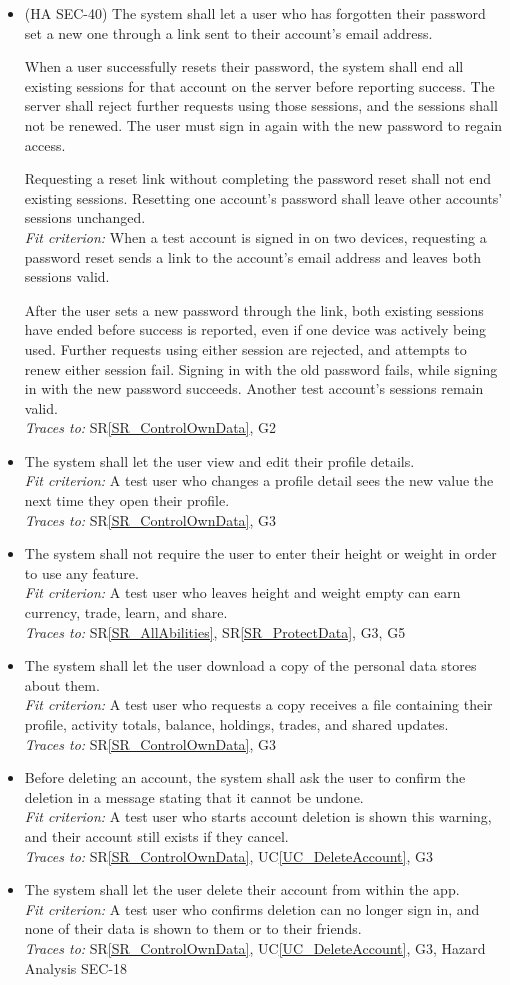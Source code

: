 \documentclass[12pt]{article}
\newcommand{\srref}[1]{SR\ref{#1}}
\newcommand{\ucref}[1]{UC\ref{#1}}
\newcounter{reqnum} %
\newcommand{\freq}[4]{%
  \item[FR\refstepcounter{reqnum}\thereqnum \label{#1}:] #2\\
  \textit{Fit criterion:} #3\\
  \textit{Traces to:} #4}
\begin{document}
\begin{itemize}
{  After either action, signing in again with the correct email address
  and password succeeds. Neither action affects another test account's
  sessions.}
  {\srref{SR_ProtectData}, G3}
\freq{FR_AcctResetPassword}
  {(HA SEC-40) The system shall let a user who has forgotten their password
  set a new one through a link sent to their account's email address.

  When a user successfully resets their password, the system shall end
  all existing sessions for that account on the server before reporting
  success. The server shall reject further requests using those sessions,
  and the sessions shall not be renewed. The user must sign in again
  with the new password to regain access.

  Requesting a reset link without completing the password reset shall not
  end existing sessions. Resetting one account's password shall leave
  other accounts' sessions unchanged.}
  {When a test account is signed in on two devices, requesting a password
  reset sends a link to the account's email address and leaves both
  sessions valid.

  After the user sets a new password through the link, both existing
  sessions have ended before success is reported, even if one device was
  actively being used. Further requests using either session are rejected,
  and attempts to renew either session fail. Signing in with the old
  password fails, while signing in with the new password succeeds.
  Another test account's sessions remain valid.}
  {\srref{SR_ControlOwnData}, G2}
\freq{FR_AcctEditProfile}
  {The system shall let the user view and edit their profile details.}
  {A test user who changes a profile detail sees the new value the next time
  they open their profile.}
  {\srref{SR_ControlOwnData}, G3}
\freq{FR_AcctBodyOptional}
  {The system shall not require the user to enter their height or weight in
  order to use any feature.}
  {A test user who leaves height and weight empty can earn currency, trade,
  learn, and share.}
  {\srref{SR_AllAbilities}, \srref{SR_ProtectData}, G3, G5}
\freq{FR_AcctDownloadData}
  {The system shall let the user download a copy of the personal data
  \progname{} stores about them.}
  {A test user who requests a copy receives a file containing their profile,
  activity totals, balance, holdings, trades, and shared updates.}
  {\srref{SR_ControlOwnData}, G3}
\freq{FR_AcctDeleteConfirm}
  {Before deleting an account, the system shall ask the user to confirm the
  deletion in a message stating that it cannot be undone.}
  {A test user who starts account deletion is shown this warning, and their
  account still exists if they cancel.}
  {\srref{SR_ControlOwnData}, \ucref{UC_DeleteAccount}, G3}
\freq{FR_AcctDelete}
  {The system shall let the user delete their account from within the app.}
  {A test user who confirms deletion can no longer sign in, and none of their
  data is shown to them or to their friends.}
  {\srref{SR_ControlOwnData}, \ucref{UC_DeleteAccount}, G3, Hazard Analysis
  SEC-18}
\end{itemize}
\end{document}
